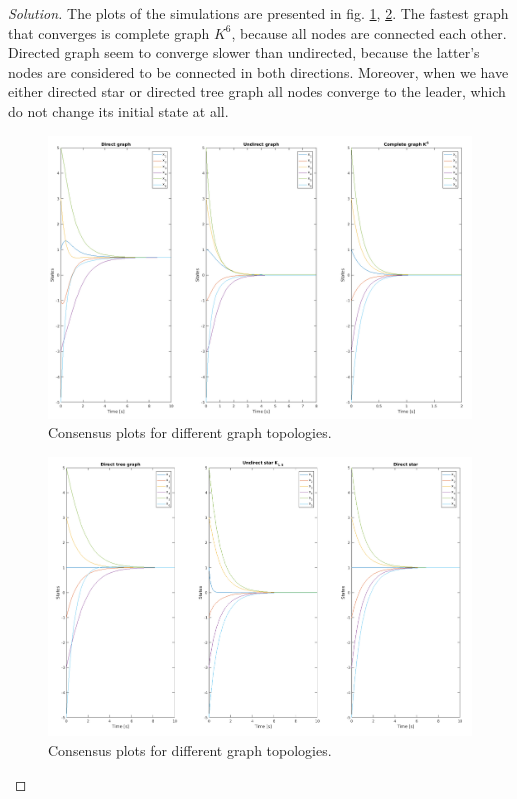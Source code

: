 \documentclass[12pt]{article}
\newenvironment{solution}{\begin{proof}[Solution]}{\end{proof}}
\begin{document}
\begin{solution}
 The plots of the simulations are presented in fig. \ref{cgt1}, \ref{cgt2}. The fastest graph that converges is complete graph $K^6$, because all nodes are connected each other. Directed graph seem to converge slower than undirected, because the latter’s nodes  are considered to be connected in both directions. Moreover, when we have either directed star or directed tree graph all nodes converge to the leader, which do not change its initial state at all. 
\begin{figure}[!h]
	\includegraphics[scale=0.315]{figures/ConsensusGraphTopologies1.png}
	\centering
	\caption{Consensus plots for different graph topologies.}
	\label{cgt1}
\end{figure}
\begin{figure}[!t]
	\includegraphics[scale=0.315]{figures/ConsensusGraphTopologies2.png}
	\centering
	\caption{Consensus plots for different graph topologies.}
	\label{cgt2}
\end{figure}


\end{solution}
\end{document}
